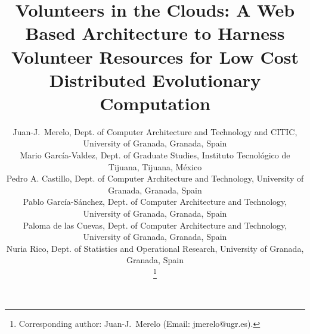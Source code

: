 \documentclass[journal,onecolumn]{IEEEtran}
\begin{document}
\title{Volunteers in the Clouds: A Web Based Architecture to Harness Volunteer Resources 
for Low Cost Distributed Evolutionary Computation }


\author{Juan-J.~Merelo, Dept. of Computer Architecture and Technology
  and CITIC, University of Granada, Granada, Spain \\
Mario Garc\'ia-Valdez, Dept. of Graduate Studies, Instituto
Tecnológico de Tijuana, Tijuana, M\'exico\\
Pedro A. Castillo, Dept. of Computer Architecture and Technology, University of Granada, Granada, Spain\\
Pablo Garc\'ia-S\'anchez, Dept. of Computer Architecture and Technology, University of Granada, Granada, Spain\\
Paloma de las Cuevas, Dept. of Computer Architecture and Technology,
University of Granada, Granada, Spain\\
Nuria Rico, Dept. of Statistics and Operational Research, University of Granada, Granada, Spain%

\thanks{Corresponding author: Juan-J.~Merelo (Email: jmerelo@ugr.es).}%
}

\maketitle
\end{document}
